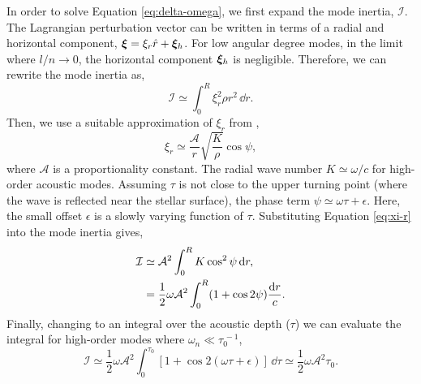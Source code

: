 \newcommand*{\propconst}{\ensuremath{{\mathcal{A}}}}

In order to solve Equation \ref{eq:delta-omega}, we first expand the mode inertia, \(\mathcal{I}\). The Lagrangian perturbation vector can be written in terms of a radial and horizontal component, \(\bm{\xi} = \xi_r \hat{r} + \bm{\xi}_h\). For low angular degree modes, in the limit where \(l/n \rightarrow 0\), the horizontal component \(\bm{\xi}_h\) is negligible. Therefore, we can rewrite the mode inertia as,
%
\begin{equation}
    \mathcal{I} \simeq \int_0^R \xi_r^2 \rho r^2 \, \dd r.
\end{equation}
%
Then, we use a suitable approximation of \(\xi_r\) from \citet{Gough1993}, 
%
\begin{equation}
    \xi_r \simeq \frac{\propconst}{r}\sqrt{\frac{K}{\rho}} \cos\psi,\label{eq:xi-r}
\end{equation}
%
where \(\propconst\) is a proportionality constant. The radial wave number \(K \simeq \omega / c\) for high-order acoustic modes. 
Assuming \(\tau\) is not close to the upper turning point (where the wave is reflected near the stellar surface), the phase term \(\psi \simeq \omega \tau + \epsilon\). Here, the small offset \(\epsilon\) is a slowly varying function of \(\tau\). Substituting Equation \ref{eq:xi-r} into the mode inertia gives,
%
\begin{align}
    \mathcal{I} &\simeq \propconst^2 \int_0^R K \cos^2\psi \, \dd r, \notag \\
    &= \frac12 \omega \propconst^2 \int_0^R (1 + \cos 2 \psi) \frac{\dd r}{c}.
\end{align}
%
Finally, changing to an integral over the acoustic depth (\(\tau\)) we can evaluate the integral for high-order modes where \(\omega_n \ll \tau_0^{\,-1}\),
%
\begin{equation}
    \mathcal{I} \simeq \frac12 \omega \propconst^2 \int_0^{\tau_0} [1 + \cos 2 (\omega\tau + \epsilon)] \, \dd \tau \simeq \frac12 \omega \propconst^2 \tau_0. \label{eq:inertia}
\end{equation}
%

